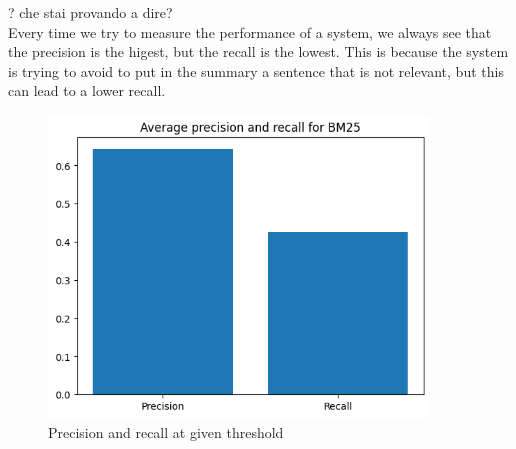 ? che stai provando a dire? \\Every time we try to measure the performance of a system, we always see that the precision is the higest, but the recall is the lowest. This is because the system is trying to avoid to put in the summary a sentence that is not relevant, but this can lead to a lower recall.

\begin{figure}
    \centering
    \includegraphics[width=0.9\textwidth]{images/pre_rec.png}
    \caption{Precision and recall at given threshold}
    \label{fig:Precision and recall}
\end{figure}